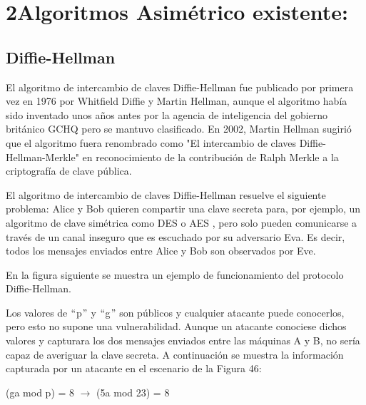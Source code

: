 \documentclass[12pt]{article}
\begin{document}
\section*{2\hspace*{10pt}Algoritmos Asimétrico existente:}
\subsection{Diffie-Hellman}
El algoritmo de intercambio de claves Diffie-Hellman fue publicado por primera vez en 1976 por Whitfield Diffie y Martin Hellman, aunque el algoritmo había sido inventado unos años antes por la agencia de inteligencia del gobierno británico GCHQ pero se mantuvo clasificado. En 2002, Martin Hellman sugirió que el algoritmo fuera renombrado como "El intercambio de claves Diffie-Hellman-Merkle" en reconocimiento de la contribución de Ralph Merkle a la criptografía de clave pública.\par


\vspace{\baselineskip}
El algoritmo de intercambio de claves Diffie-Hellman resuelve el siguiente problema: Alice y Bob quieren compartir una clave secreta para, por ejemplo, un algoritmo de clave simétrica como DES o AES , pero solo pueden comunicarse a través de un canal inseguro que es escuchado por su adversario Eva. Es decir, todos los mensajes enviados entre Alice y Bob son observados por Eve.\par

En la figura siguiente se muestra un ejemplo de funcionamiento del protocolo Diffie-Hellman.\par


\vspace{\baselineskip}

\vspace{\baselineskip}
Los valores de $``$p$"$  y $``$g$"$  son públicos y cualquier atacante puede conocerlos, pero esto no supone una vulnerabilidad. Aunque un atacante conociese dichos valores y capturara los dos mensajes enviados entre las máquinas A y B, no sería capaz de averiguar la clave secreta. A continuación se muestra la información capturada por un atacante en el escenario de la Figura 46:\par


\vspace{\baselineskip}
(ga mod p) = 8 $ \rightarrow $  (5a mod 23) = 8\par
\end{document}
